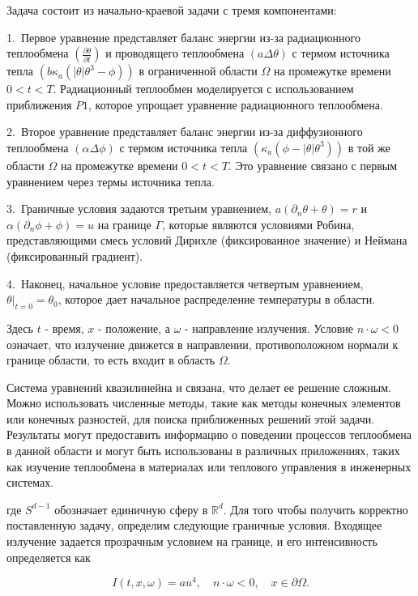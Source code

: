 Задача состоит из начально-краевой задачи с тремя компонентами:


1.\ Первое уравнение представляет баланс энергии из-за радиационного
теплообмена $\left(\frac{\partial \theta}{\partial t}\right)$ и проводящего
теплообмена $(a \Delta \theta)$ с термом источника тепла
$\left(b \kappa_a \left(|\theta| \theta^3 - \phi \right)\right)$
в ограниченной области $\Omega$ на промежутке времени $0 < t < T$.
Радиационный теплообмен моделируется с использованием приближения $P1$,
которое упрощает уравнение радиационного теплообмена.

2.\ Второе уравнение представляет баланс энергии из-за диффузионного
теплообмена $(\alpha \Delta \phi)$ с термом источника тепла
$\left(\kappa_a \left(\phi - |\theta| \theta^3 \right)\right)$
в той же области $\Omega$ на промежутке времени $0 < t < T$.
Это уравнение связано с первым уравнением через термы источника тепла.

3.\ Граничные условия задаются третьим уравнением,
$a(\partial_n \theta + \theta) = r$ и $\alpha(\partial_n \phi + \phi) = u$
на границе $\Gamma$, которые являются условиями Робина,
представляющими смесь условий Дирихле
(фиксированное значение) и Неймана (фиксированный градиент).

4.\ Наконец, начальное условие предоставляется четвертым уравнением,
$\theta|_{t=0} = \theta_0$, которое дает начальное
распределение температуры в области.

Здесь $t$ - время, $x$ - положение, а $\omega$ - направление излучения.
Условие $n \cdot \omega < 0$ означает, что излучение движется в направлении,
противоположном нормали к границе области, то есть входит в область $\Omega$.

Система уравнений квазилинейна и связана, что делает ее решение сложным.
Можно использовать численные методы, такие как методы конечных элементов
или конечных разностей, для поиска приближенных решений этой задачи.
Результаты могут предоставить информацию о поведении процессов теплообмена
в данной области и могут быть использованы в различных приложениях,
таких как изучение теплообмена в материалах или теплового управления
в инженерных системах.

где $S^{d-1}$ обозначает единичную сферу в $\mathbb{R}^{d}$.
Для того чтобы получить корректно поставленную задачу, определим
следующие граничные условия.
Входящее излучение задается прозрачным условием на границе,
и его интенсивность определяется как

\[
    I(t, x, \omega) = a u^{4}, \quad n \cdot \omega < 0,
    \quad x \in \partial \Omega.
\]

